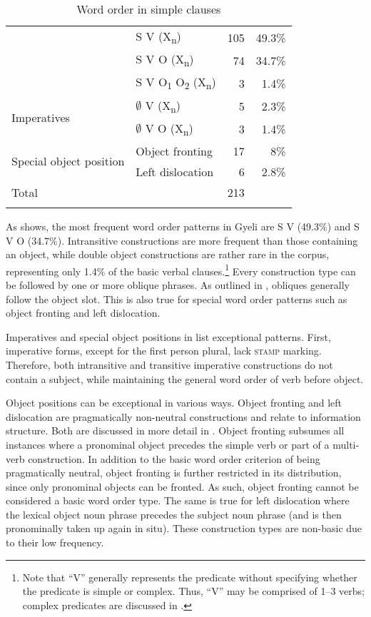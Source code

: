 \begin{table}
\begin{tabular}{llrr}
 \lsptoprule
\multirow{3}{*}{Basic word order} & S V (X\textsubscript{n}) & 105 & 49.3\% \\
& S V O (X\textsubscript{n}) & 74 & 34.7\%\\
& S V O\textsubscript{1} O\textsubscript{2} (X\textsubscript{n}) & 3 & 1.4\% \\
 \midrule 
\multirow{2}{*}{Imperatives} &  $\emptyset$ V (X\textsubscript{n}) & 5 & 2.3\% \\
 & $\emptyset$ V O (X\textsubscript{n}) & 3 & 1.4\%  \\
 \midrule
\multirow{2}{*}{Special object position}  & Object fronting & 17 & 8\%  \\
 & Left dislocation & 6  & 2.8\% \\
 \midrule
Total & &  213 \\
 \lspbottomrule
\end{tabular}
\caption{Word order in simple clauses}
\label{Tab:BCT}
\end{table}

As  shows, the most frequent word order patterns in Gyeli are S V (49.3\%) and S V O (34.7\%). Intransitive constructions are more frequent than those containing an object, while double object constructions are rather rare in the corpus, representing only 1.4\% of the basic verbal clauses.\footnote{Note that ``V'' generally represents the predicate without specifying whether the predicate is simple or complex. Thus, ``V'' may be comprised of 1--3 verbs; complex predicates are discussed in .} Every construction type can be followed by one or more oblique phrases.  As outlined in , obliques generally follow the object slot. This is also true for special word order patterns such as object fronting and left dislocation.

Imperatives and special object positions in  list exceptional patterns. First, imperative forms, except for the first person plural, lack \textsc{stamp} marking. Therefore, both intransitive and transitive imperative constructions do not contain a subject, while maintaining the general word order of verb before object.

Object positions can be exceptional in various ways. Object fronting and left dislocation are pragmatically non-neutral constructions and relate to information structure. Both are discussed in more detail in . Object fronting subsumes all instances where a pronominal object precedes the simple verb or part of a multi-verb construction. In addition to the basic word order criterion of being pragmatically neutral, object fronting is further restricted in its distribution, since only pronominal objects can be fronted. As such, object fronting cannot be considered a basic word order type. The same is true for left dislocation where the lexical object noun phrase precedes the subject noun phrase (and is then pronominally taken up again in situ). These construction types are non-basic due to their low frequency.

